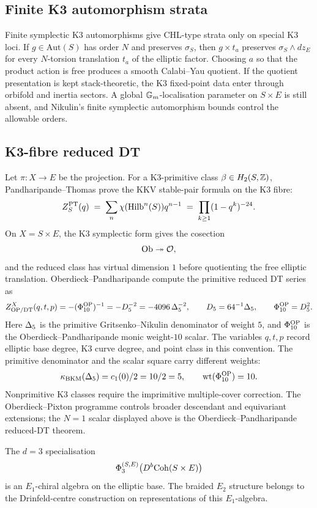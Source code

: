 \subsection*{Finite K3 automorphism strata}

Finite symplectic K3 automorphisms give CHL-type strata only on special
K3 loci.  If \(g\in\mathrm{Aut}(S)\) has order \(N\) and preserves
\(\sigma_S\), then \(g\times t_a\) preserves
\(\sigma_S\wedge dz_E\) for every \(N\)-torsion translation \(t_a\) of
the elliptic factor.  Choosing \(a\) so that the product action is free
produces a smooth Calabi--Yau quotient.  If the quotient presentation is
kept stack-theoretic, the K3 fixed-point data enter through orbifold and
inertia sectors.  A global
\(\mathbb G_m\)-localisation parameter on \(S\times E\) is still absent, and
Nikulin's finite symplectic automorphism bounds control the allowable
orders.

\subsection*{K3-fibre reduced DT}

Let \(\pi:X\to E\) be the projection.  For a K3-primitive class
\(\beta\in H_2(S,\mathbb Z)\), Pandharipande--Thomas prove the KKV
stable-pair formula on the K3 fibre:
\[
 Z^{\mathrm{PT}}_{S}(q)
 \;=\;
 \sum_{n}\chi(\mathrm{Hilb}^{n}(S))q^{n-1}
 \;=\;
 \prod_{k\geq 1}(1-q^{k})^{-24}.
\]
On \(X=S\times E\), the K3 symplectic form gives the cosection
\[
  \mathrm{Ob}\twoheadrightarrow\mathcal O,
\]
and the reduced class has virtual dimension \(1\) before quotienting the
free elliptic translation.  Oberdieck--Pandharipande compute the
primitive reduced DT series as
\[
  Z^{X}_{\mathrm{OP/DT}}(q,t,p)
  =
  -(\Phi_{10}^{\mathrm{OP}})^{-1}
  =
  -D_5^{-2}
  =
  -4096\,\Delta_5^{-2},
  \qquad
  D_5=64^{-1}\Delta_5,\qquad
  \Phi_{10}^{\mathrm{OP}}=D_5^2.
\]
Here \(\Delta_5\) is the primitive Gritsenko--Nikulin denominator of
weight \(5\), and \(\Phi_{10}^{\mathrm{OP}}\) is the Oberdieck--Pandharipande monic
weight-\(10\) scalar.  The variables \(q,t,p\) record elliptic base
degree, K3 curve degree, and point class in this convention.  The
primitive denominator and the scalar square carry different weights:
\[
  \kappa_{\mathrm{BKM}}(\Delta_5)=c_1(0)/2=10/2=5,\qquad
  \mathrm{wt}(\Phi_{10}^{\mathrm{OP}})=10.
\]
Nonprimitive K3 classes require the imprimitive multiple-cover
correction.  The Oberdieck--Pixton programme controls broader
descendant and equivariant extensions; the \(N=1\) scalar displayed
above is the Oberdieck--Pandharipande reduced-DT theorem.

The \(d=3\) specialisation
\[
  \Phi_3^{(S,E)}\bigl(D^{b}\mathrm{Coh}(S\times E)\bigr)
\]
is an \(E_1\)-chiral algebra on the elliptic base.  The braided \(E_2\)
structure belongs to the Drinfeld-centre construction on
representations of this \(E_1\)-algebra.

